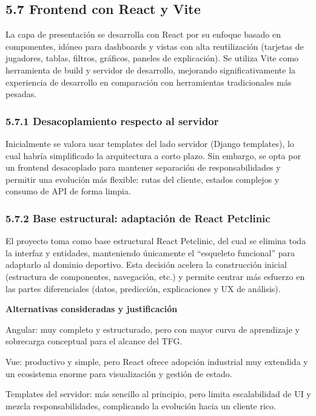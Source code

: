 \subsection{5.7 Frontend con React y Vite}

La capa de presentación se desarrolla con React por su enfoque basado en componentes, idóneo para 
dashboards y vistas con alta reutilización (tarjetas de jugadores, tablas, filtros, gráficos, 
paneles de explicación). Se utiliza Vite como herramienta de build y servidor de desarrollo, 
mejorando significativamente la experiencia de desarrollo en comparación con herramientas 
tradicionales más pesadas.

\subsubsection{5.7.1 Desacoplamiento respecto al servidor}

Inicialmente se valora usar templates del lado servidor (Django templates), lo cual habría 
simplificado la arquitectura a corto plazo. Sin embargo, se opta por un frontend desacoplado para 
mantener separación de responsabilidades y permitir una evolución más flexible: rutas del cliente, 
estados complejos y consumo de API de forma limpia.

\subsubsection{5.7.2 Base estructural: adaptación de React Petclinic}

El proyecto toma como base estructural React Petclinic, del cual se elimina toda la interfaz y 
entidades, manteniendo únicamente el ``esqueleto funcional'' para adaptarlo al dominio deportivo. 
Esta decisión acelera la construcción inicial (estructura de componentes, navegación, etc.) y permite 
centrar más esfuerzo en las partes diferenciales (datos, predicción, explicaciones y UX de análisis).

\textbf{Alternativas consideradas y justificación}

Angular: muy completo y estructurado, pero con mayor curva de aprendizaje y sobrecarga conceptual 
para el alcance del TFG.

Vue: productivo y simple, pero React ofrece adopción industrial muy extendida y un ecosistema enorme 
para visualización y gestión de estado.

Templates del servidor: más sencillo al principio, pero limita escalabilidad de UI y mezcla 
responsabilidades, complicando la evolución hacia un cliente rico.

